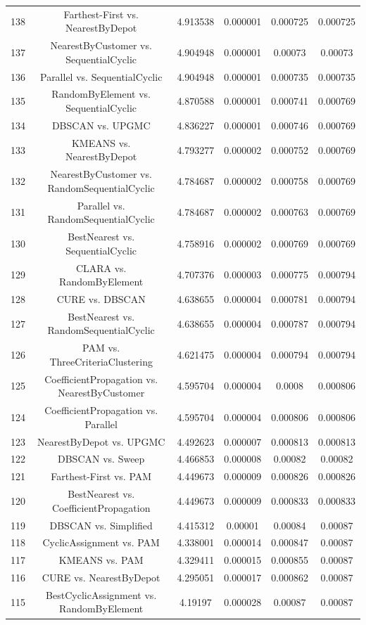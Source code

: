\documentclass[a4paper,10pt]{article}
\begin{document}
\begin{landscape}
\begin{table}[!htp]
\begin{tabular}{cccccc}
138&Farthest-First vs. NearestByDepot&4.913538&0.000001&0.000725&0.000725\\
137&NearestByCustomer vs. SequentialCyclic&4.904948&0.000001&0.00073&0.00073\\
136&Parallel vs. SequentialCyclic&4.904948&0.000001&0.000735&0.000735\\
135&RandomByElement vs. SequentialCyclic&4.870588&0.000001&0.000741&0.000769\\
134&DBSCAN vs. UPGMC&4.836227&0.000001&0.000746&0.000769\\
133&KMEANS vs. NearestByDepot&4.793277&0.000002&0.000752&0.000769\\
132&NearestByCustomer vs. RandomSequentialCyclic&4.784687&0.000002&0.000758&0.000769\\
131&Parallel vs. RandomSequentialCyclic&4.784687&0.000002&0.000763&0.000769\\
130&BestNearest vs. SequentialCyclic&4.758916&0.000002&0.000769&0.000769\\
129&CLARA vs. RandomByElement&4.707376&0.000003&0.000775&0.000794\\
128&CURE vs. DBSCAN&4.638655&0.000004&0.000781&0.000794\\
127&BestNearest vs. RandomSequentialCyclic&4.638655&0.000004&0.000787&0.000794\\
126&PAM vs. ThreeCriteriaClustering&4.621475&0.000004&0.000794&0.000794\\
125&CoefficientPropagation vs. NearestByCustomer&4.595704&0.000004&0.0008&0.000806\\
124&CoefficientPropagation vs. Parallel&4.595704&0.000004&0.000806&0.000806\\
123&NearestByDepot vs. UPGMC&4.492623&0.000007&0.000813&0.000813\\
122&DBSCAN vs. Sweep&4.466853&0.000008&0.00082&0.00082\\
121&Farthest-First vs. PAM&4.449673&0.000009&0.000826&0.000826\\
120&BestNearest vs. CoefficientPropagation&4.449673&0.000009&0.000833&0.000833\\
119&DBSCAN vs. Simplified&4.415312&0.00001&0.00084&0.00087\\
118&CyclicAssignment vs. PAM&4.338001&0.000014&0.000847&0.00087\\
117&KMEANS vs. PAM&4.329411&0.000015&0.000855&0.00087\\
116&CURE vs. NearestByDepot&4.295051&0.000017&0.000862&0.00087\\
115&BestCyclicAssignment vs. RandomByElement&4.19197&0.000028&0.00087&0.00087\\

\end{tabular}
\end{table}
\end{landscape}
\end{document}
